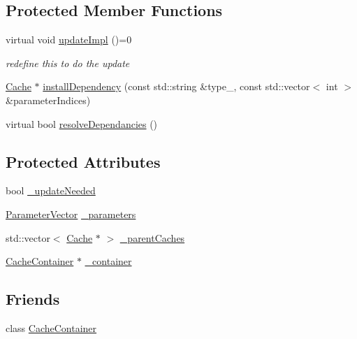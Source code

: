 \subsection*{Protected Member Functions}
\begin{DoxyCompactItemize}
\item 
virtual void \hyperlink{classg2o_1_1Cache_ae46e4a4e37c034925edd6bbfdfaa1cb2}{update\+Impl} ()=0
\begin{DoxyCompactList}\small\item\em redefine this to do the update \end{DoxyCompactList}\item 
\hyperlink{classg2o_1_1Cache}{Cache} $\ast$ \hyperlink{classg2o_1_1Cache_a776574fb98726ff61bc1280ea624c6e5}{install\+Dependency} (const std\+::string \&type\+\_\+, const std\+::vector$<$ int $>$ \&parameter\+Indices)
\item 
virtual bool \hyperlink{classg2o_1_1Cache_a0c26f0baa33a5902002f1ca2d5f57ece}{resolve\+Dependancies} ()
\end{DoxyCompactItemize}
\subsection*{Protected Attributes}
\begin{DoxyCompactItemize}
\item 
bool \hyperlink{classg2o_1_1Cache_a28d0ad45da71d9b7bc6de4cf1fb0f9e4}{\+\_\+update\+Needed}
\item 
\hyperlink{namespaceg2o_a85cc8f2c7db8cab47b2b269a7acd6785}{Parameter\+Vector} \hyperlink{classg2o_1_1Cache_ad596a1a7591adece4664a43fc87b881d}{\+\_\+parameters}
\item 
std\+::vector$<$ \hyperlink{classg2o_1_1Cache}{Cache} $\ast$ $>$ \hyperlink{classg2o_1_1Cache_a0b38f0c773c02903acf8964f73c3aa26}{\+\_\+parent\+Caches}
\item 
\hyperlink{classg2o_1_1CacheContainer}{Cache\+Container} $\ast$ \hyperlink{classg2o_1_1Cache_a098aeecd7f0daa19a58f710ae7cb27c3}{\+\_\+container}
\end{DoxyCompactItemize}
\subsection*{Friends}
\begin{DoxyCompactItemize}
\item 
class \hyperlink{classg2o_1_1Cache_a86dec1e0424aa4ae4e6867c69efd7868}{Cache\+Container}
\end{DoxyCompactItemize}


